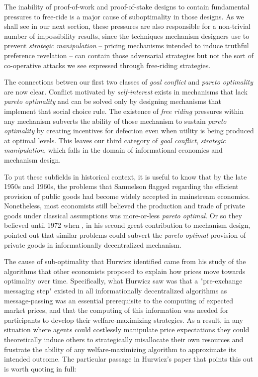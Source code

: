 The inability of proof-of-work and proof-of-stake designs to contain fundamental pressures to free-ride is a major cause of suboptimality in those designs. As we shall see in our next section, these pressures are also responsible for a non-trivial number of impossibility results, since the techniques mechanism designers use to prevent \textit{strategic manipulation} -- pricing mechanisms intended to induce truthful preference revelation -- can contain those adversarial strategies but not the sort of co-operative attacks we see expressed through free-riding strategies.

The connections betwen our first two classes of \textit{goal conflict} and \textit{pareto optimality} are now clear. Conflict motivated by \textit{self-interest} exists in mechanisms that lack \textit{pareto optimality} and can be solved only by designing mechanisms that implement that social choice rule. The existence of \textit{free riding} pressures within any mechanism subverts the ability of those mechanism to sustain \textit{pareto optimality} by creating incentives for defection even when utility is being produced at optimal levels. This leaves our third category of \textit{goal conflict}, \textit{strategic manipulation}, which falls in the domain of informational economics and mechanism design. 

To put these subfields in historical context, it is useful to know that by the late 1950s and 1960s, the problems that Samuelson flagged regarding the efficient provision of public goods had become widely accepted in mainstream economics. Nonetheless, most economists still believed the production and trade of private goods under classical assumptions was more-or-less \textit{pareto optimal}. Or so they believed until 1972 when \citet{hurwicz1973design}, in his second great contribution to mechanism design, pointed out that similar problems could subvert the \textit{pareto optimal} provision of private goods in informationally decentralized mechanism.

The cause of sub-optimality that Hurwicz identified came from his study of the algorithms that other economists proposed to explain how prices move towards optimality over time. Specifically, what Hurwicz saw was that a "pre-exchange messaging step" existed in all informationally decentralized algorithms as message-passing was an essential prerequisite to the computing of expected market prices, and that the computing of this information was needed for participants to develop their welfare-maximizing strategies. As a result, in any situation where agents could costlessly manipulate price expectations they could theoretically induce others to strategically misallocate their own resources and frustrate the ability of any welfare-maximizing algorithm to approximate its intended outcome. The particular passage in Hurwicz's paper that points this out is worth quoting in full:

